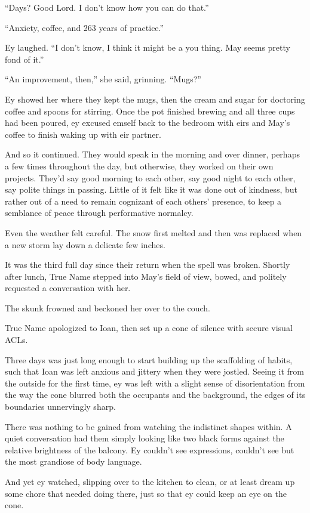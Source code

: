 ``Days? Good Lord. I don't know how you can do that.''

``Anxiety, coffee, and 263 years of practice.''

Ey laughed. ``I don't know, I think it might be a you thing. May seems pretty fond of it.''

``An improvement, then,'' she said, grinning. ``Mugs?''

Ey showed her where they kept the mugs, then the cream and sugar for doctoring coffee and spoons for stirring. Once the pot finished brewing and all three cups had been poured, ey excused emself back to the bedroom with eirs and May's coffee to finish waking up with eir partner.

And so it continued. They would speak in the morning and over dinner, perhaps a few times throughout the day, but otherwise, they worked on their own projects. They'd say good morning to each other, say good night to each other, say polite things in passing. Little of it felt like it was done out of kindness, but rather out of a need to remain cognizant of each others' presence, to keep a semblance of peace through performative normalcy.

Even the weather felt careful. The snow first melted and then was replaced when a new storm lay down a delicate few inches.

It was the third full day since their return when the spell was broken. Shortly after lunch, True Name stepped into May's field of view, bowed, and politely requested a conversation with her.

The skunk frowned and beckoned her over to the couch.

True Name apologized to Ioan, then set up a cone of silence with secure visual ACLs.

Three days was just long enough to start building up the scaffolding of habits, such that Ioan was left anxious and jittery when they were jostled. Seeing it from the outside for the first time, ey was left with a slight sense of disorientation from the way the cone blurred both the occupants and the background, the edges of its boundaries unnervingly sharp.

There was nothing to be gained from watching the indistinct shapes within. A quiet conversation had them simply looking like two black forms against the relative brightness of the balcony. Ey couldn't see expressions, couldn't see but the most grandiose of body language.

And yet ey watched, slipping over to the kitchen to clean, or at least dream up some chore that needed doing there, just so that ey could keep an eye on the cone.

